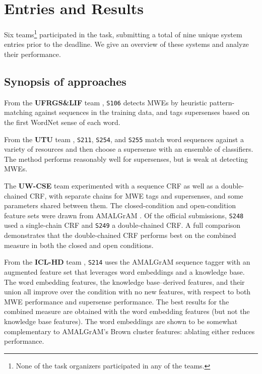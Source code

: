 \documentclass[11pt,letterpaper]{article}
\newcommand{\sys}[1]{\mbox{\texttt{#1}}}   %
\begin{document}
\section{Entries and Results}\label{sec:results}

Six teams\footnote{None of the task organizers participated in any of the teams.} participated in the task, 
submitting a total of nine unique system entries prior to the deadline. 
We give an overview of these systems and analyze their performance.

\subsection{Synopsis of approaches}

From the \textbf{UFRGS\&LIF} team \citep{dimsum-16-ufrgs},
\sys{S106} detects MWEs by heuristic pattern-matching against sequences in the training data, 
and tags supersenses based on the first WordNet sense of each word.

From the \textbf{UTU} team \citep{dimsum-16-utu},
\sys{S211}, \sys{S254}, and \sys{S255} 
match word sequences against a variety of resources
and then choose a supersense with an ensemble of classifiers. 
The method performs reasonably well for supersenses, but is weak at detecting MWEs.


The \textbf{UW-CSE} team \citep{dimsum-16-uw} 
experimented with a sequence CRF as well as a double-chained CRF, 
with separate chains for MWE tags and supersenses, and some parameters shared between them.
The closed-condition and open-condition feature sets were drawn from AMALGrAM \citep{schneider-15}.
Of the official submissions, \sys{S248} used a single-chain CRF and \sys{S249} a double-chained CRF.
A full comparison demonstrates that the double-chained CRF performs best on the combined measure 
in both the closed and open conditions. 

From the \textbf{ICL-HD} team \citep{dimsum-16-icl},
\sys{S214} uses the AMALGrAM sequence tagger \citep{schneider-15} 
with an augmented feature set that leverages word embeddings 
and a knowledge base. The word embedding features, the knowledge base--derived 
features, and their union all improve over the condition with no new features, 
with respect to both MWE performance and supersense performance. 
The best results for the combined measure are obtained with the 
word embedding features (but not the knowledge base features). 
The word embeddings are shown to be somewhat complementary 
to AMALGrAM's Brown cluster features: ablating either reduces performance.
\end{document}
